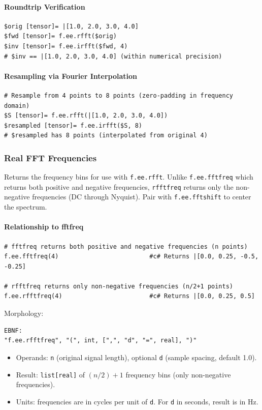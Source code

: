 \paragraph{Roundtrip Verification}
\begin{verbatim}
$orig [tensor]= |[1.0, 2.0, 3.0, 4.0]
$fwd [tensor]= f.ee.rfft($orig)
$inv [tensor]= f.ee.irfft($fwd, 4)
# $inv == |[1.0, 2.0, 3.0, 4.0] (within numerical precision)
\end{verbatim}

\paragraph{Resampling via Fourier Interpolation}
\begin{verbatim}
# Resample from 4 points to 8 points (zero-padding in frequency domain)
$S [tensor]= f.ee.rfft(|[1.0, 2.0, 3.0, 4.0])
$resampled [tensor]= f.ee.irfft($S, 8)
# $resampled has 8 points (interpolated from original 4)
\end{verbatim}

\subsubsection{Real FFT Frequencies}
\label{sec:rfftfreq}
Returns the frequency bins for use with \texttt{f.ee.rfft}. Unlike \texttt{f.ee.fftfreq} which returns both positive and negative frequencies, \texttt{rfftfreq} returns only the non-negative frequencies (DC through Nyquist). Pair with \texttt{f.ee.fftshift} to center the spectrum.

\paragraph{Relationship to fftfreq}
\begin{verbatim}
# fftfreq returns both positive and negative frequencies (n points)
f.ee.fftfreq(4)                         #c# Returns |[0.0, 0.25, -0.5, -0.25]

# rfftfreq returns only non-negative frequencies (n/2+1 points)
f.ee.rfftfreq(4)                        #c# Returns |[0.0, 0.25, 0.5]
\end{verbatim}

Morphology:
\begin{verbatim}
EBNF:
"f.ee.rfftfreq", "(", int, [",", "d", "=", real], ")"
\end{verbatim}
\begin{itemize}
\item Operands: \texttt{n} (original signal length), optional \texttt{d} (sample spacing, default 1.0).
\item Result: \texttt{list[real]} of $(n/2)+1$ frequency bins (only non-negative frequencies).
\item Units: frequencies are in cycles per unit of \texttt{d}. For \texttt{d} in seconds, result is in Hz.
\end{itemize}

